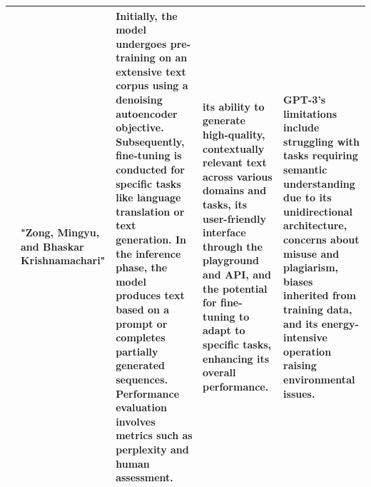 \documentclass[conference]{IEEEtran}
\begin{document}
\begin{table}
\begin{center}
\begin{tabular}{ |p{1cm}|p{2cm}|p{4cm}|p{4cm}|p{4cm}| }
 \hline
[30]  & "Zong, Mingyu, and Bhaskar Krishnamachari" & Initially, the model undergoes pre-training on an extensive text corpus using a denoising autoencoder objective. Subsequently, fine-tuning is conducted for specific tasks like language translation or text generation. In the inference phase, the model produces text based on a prompt or completes partially generated sequences. Performance evaluation involves metrics such as perplexity and human assessment. & its ability to generate high-quality, contextually relevant text across various domains and tasks, its user-friendly interface through the playground and API, and the potential for fine-tuning to adapt to specific tasks, enhancing its overall performance. & GPT-3's limitations include struggling with tasks requiring semantic understanding due to its unidirectional architecture, concerns about misuse and plagiarism, biases inherited from training data, and its energy-intensive operation raising environmental issues. \\
\hline
\end{tabular}
\end{center}
\end{table}
\end{document}
